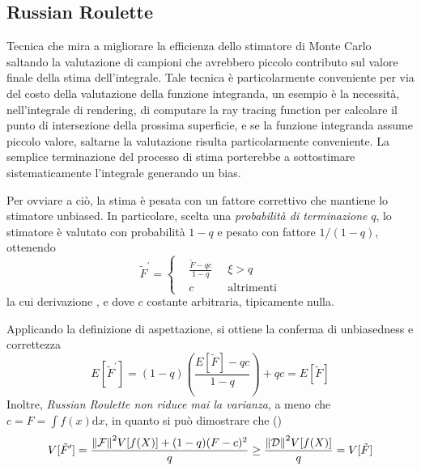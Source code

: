 \subsection{Russian Roulette}\label{chapter6:variance:russianRoulette}
Tecnica che mira a migliorare la efficienza dello stimatore di Monte Carlo saltando la valutazione di campioni che avrebbero piccolo contributo 
sul valore finale della stima dell'integrale. Tale tecnica \`e particolarmente conveniente per via del costo della valutazione della funzione 
integranda, un esempio \`e la necessit\`a, nell'integrale di rendering, di computare la ray tracing function per calcolare il punto di intersezione 
della prossima superficie, e se la funzione integranda assume piccolo valore, saltarne la valutazione risulta particolarmente conveniente. La semplice 
terminazione del processo di stima porterebbe a sottostimare sistematicamente l'integrale generando un bias.\par
Per ovviare a ci\`o, la stima \`e pesata con un fattore correttivo che mantiene lo stimatore unbiased. In particolare, scelta una \textit{probabilit\`a
di terminazione} $q$, lo stimatore \`e valutato con probabilit\`a $1-q$ e pesato con fattore $1/(1-q)$, ottenendo
\begin{equation}\label{chapter6:variance:russianEstimator}
	\tilde{F}^\prime=\left\{\begin{aligned}
		&\frac{\tilde{F}-qc}{1-q}\;\;&\xi>q\\
		&c &\text{altrimenti}
	\end{aligned}\right.
\end{equation}
la cui derivazione \cite{pegoraro}, e dove $c$ costante arbitraria, tipicamente nulla.\par
Applicando la definizione di aspettazione, si ottiene la conferma di unbiasedness e correttezza
\begin{equation}
	E[\tilde{F}^\prime]=(1-q)\left(\frac{E[\tilde{F}]-qc}{1-q}\right)+qc=E[\tilde{F}]
\end{equation}
Inoltre, \textit{Russian Roulette non riduce mai la varianza}, a meno che $c=F=\int f(x)\mathrm{d}x$, in quanto si pu\`o dimostrare che 
(\cite{pegoraro})
\begin{equation}
	V[\tilde{F}^\prime]=\frac{\norm{\mathcal{F}}^2V[f(X)]+(1-q)(F-c)^2}{q}\geq\frac{\norm{\mathcal{D}}^2V[f(X)]}{q}=V[\tilde{F}]
\end{equation}
